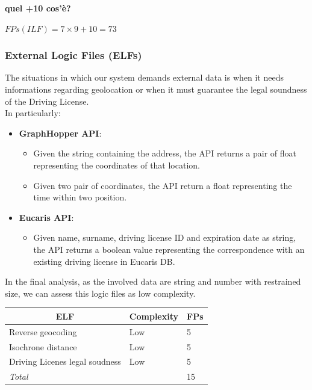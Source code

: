 \documentclass[english]{article}
\begin{document}
\textbf{quel +10 cos'è?}

\begin{center}
$ FPs (ILF) = 7 \times 9 + 10= 73 $
\end{center}

\subsubsection{External Logic Files (ELFs)}

The situations in which our system demands external data is when it needs informations regarding geolocation or when it must guarantee the legal soundness of the Driving License.\\
In particularly:

\begin{itemize}
	\item \textbf{GraphHopper API}:
		\begin{itemize}
			\item{Given the string containing the address, the API returns a pair of float representing the coordinates of that location.}
			\item{Given two pair of coordinates, the API return a float representing the time within two position.}
		\end{itemize}
	\item \textbf{Eucaris API}:
		\begin{itemize}
			\item{Given name, surname, driving license ID and expiration date as string, the API returns a boolean value representing the correspondence with an existing driving license in Eucaris DB.}
		\end{itemize}
\end{itemize}

In the final analysis, as the involved data are string and number with restrained size, we can assess this logic files as low complexity.\\

\begin{center}
	\begin{tabular}{ |p{8cm}|m{2cm}|p{1cm}| }
		\hline
		\multicolumn{1}{|c|}{\textbf{ELF}} & \multicolumn{1}{c|}{\textbf{Complexity}} & \multicolumn{1}{c|}{\textbf{FPs}} \\
		\hline
		Reverse geocoding & Low & 5 \\
		\hline
		Isochrone distance & Low & 5\\
		\hline
		Driving Licenes legal soudness & Low & 5\\
		\hline
		\multicolumn{2}{|l|}{\textit{Total}} & \multicolumn{1}{l|}{15} \\
		\hline
	\end{tabular}
\end{center}
\end{document}
